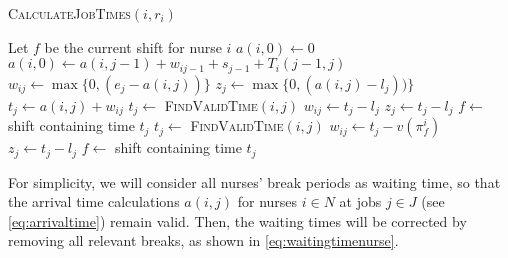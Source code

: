 \documentclass[a4paper,11pt,authoryear]{elsarticle}
\begin{document}
\begin{algorithm}[h]
\caption{\textsc{CalculateJobTimes}$(i, r_i)$}
\label{alg:shiftwork}
\begin{algorithmic}[1]
	\State Let $f$ be the current shift for nurse $i$
	\State $a(i,0) \gets 0$
		\State $a(i,0) \gets a(i, j-1) + w_{ij-1} + s_{j-1} + T_i(j-1, j)$
			\State $w_{ij} \gets \max\{0, (e_j-a(i,j))\}$
			\State $z_j \gets \max\{0, (a(i,j) - l_j))\}$
			\State $t_j \gets a(i,j) + w_{ij}$
			\State $t_j \gets$ \textsc{FindValidTime}$(i, j)$
			\State $w_{ij} \gets t_j - l_j$
			\State $z_j \gets t_j - l_j$
			\State $f \gets$ shift containing time $t_j$
			\State $t_j \gets$ \textsc{FindValidTime}$(i,j)$
			\State $w_{ij} \gets t_j - v(\pi_{f}^{i})$
			\State $z_j \gets t_j - l_j$
			\State $f \gets$ shift containing time $t_j$
		\EndIf
	\EndFor
\end{algorithmic}
\end{algorithm}

For simplicity, we will consider all nurses' break periods as waiting time, so that the arrival time calculations $a(i,j)$ for nurses $i \in N$ at jobs $j \in J$ (see \eqref{eq:arrivaltime}) remain valid. Then, the waiting times will be corrected by removing all relevant breaks, as shown in \eqref{eq:waitingtimenurse}.


\end{document}
